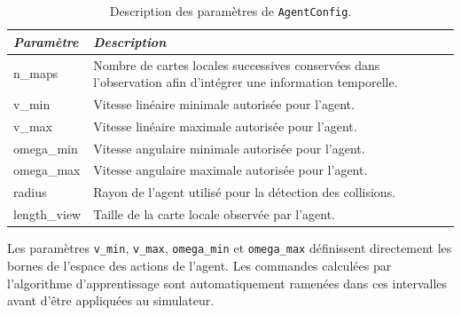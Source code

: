 \begin{table}[h]
    \centering
    \caption{Description des paramètres de \texttt{AgentConfig}.}
    \label{tab:agent_parameters}
    \begin{tabularx}{\textwidth}{>{\ttfamily\small}l X}
        \toprule
        \textnormal{\textit{Paramètre}} &
        \textit{Description}                                                                                                                             \\
        \midrule

        n\_maps
                                        & Nombre de cartes locales successives conservées dans l'observation afin d'intégrer une information temporelle. \\

        v\_min
                                        & Vitesse linéaire minimale autorisée pour l'agent.                                                              \\

        v\_max
                                        & Vitesse linéaire maximale autorisée pour l'agent.                                                              \\

        omega\_min
                                        & Vitesse angulaire minimale autorisée pour l'agent.                                                             \\

        omega\_max
                                        & Vitesse angulaire maximale autorisée pour l'agent.                                                             \\

        radius
                                        & Rayon de l'agent utilisé pour la détection des collisions.                                                     \\

        length\_view
                                        & Taille de la carte locale observée par l'agent.                                                                \\

        \bottomrule
    \end{tabularx}
\end{table}

\noindent Les paramètres \texttt{v\_min}, \texttt{v\_max}, \texttt{omega\_min} et \texttt{omega\_max} définissent directement les bornes de l'espace des actions de l'agent. Les commandes calculées par l'algorithme d'apprentissage sont automatiquement ramenées dans ces intervalles avant d'être appliquées au simulateur.

